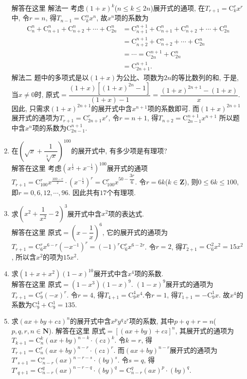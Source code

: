 \documentclass[10pt,a4paper]{article}
\begin{document}
\begin{enumerate}[1.]
解答在这里 解法一  考虑$(1+x)^k$($n\le k\le 2n$)展开式的通项, 在$T_{r+1}=\mathrm{C}_k^rx^r$中, 令$r=n$, 得$T_{n-1}=\mathrm{C}_k^nx^n$, 故$x^n$项的系数为
\begin{align*} \mathrm{C}_n^n+\mathrm{C}_{n+1}^n+\mathrm{C}_{n+2}^n+\cdots +\mathrm{C}_{2n}^n&=\mathrm{C}_{n+1}^{n+1}+\mathrm{C}_{n+1}^n+\mathrm{C}_{n+2}^n+\cdots +\mathrm{C}_{2n}^n\\
&=\mathrm{C}_{n+2}^{n+1}+\mathrm{C}_{n+2}^n+\cdots +\mathrm{C}_{2n}^n \\ &=\cdots =\mathrm{C}_{2n}^{n+1}+\mathrm{C}_{2n}^n \\ &=\mathrm{C}_{2n+1}^{n+1}.
\end{align*}
解法二  题中的多项式是以$(1+x)$为公比、项数为$2n$的等比数列的和, 于是, 当$x\ne 0$时, 原式$=\dfrac{(1+x)[(1+x)^{2n}-1]}{(1+x)-1}=\dfrac{(1+x)^{2n+1}-(1+x)}x$.
因此, 只需求$(1+x)^{2n+1}$的展开式中含$x^{n+1}$项的系数即可.
而$(1+x)^{2n+1}$展开式的通项为$T_{r+1}=\mathrm{C}_{2n+1}^rx^r$, 令$r=n+1$, 得$T_{n+2}=\mathrm{C}_{2n-1}^{n+1}x^{n+1}$
所以题中含$x^n$项的系数为$\mathrm{C}_{2n-1}^{n+1}$.
\item 在$(\sqrt x+\dfrac 1{\sqrt[3]x})^{100}$的展开式中, 有多少项是有理项?\\
解答在这里  考虑$(x^{\frac 12}+x^{-\frac 13})^{100}$展开式的通项$T_{r+1}=\mathrm{C}_{100}^rx^{\frac{100-r}2}\cdot (x^{-\frac 13})^r=\mathrm{C}_{100}^rx^{50-\dfrac{3r}6}$.
令$r=6k$($k\in \mathbf{Z}$), 则$0\le 6k\le 100$, 即$r=0,6,12,\cdots ,96$.
因此共有$17$个有理项.
\item 求$(x^2+\dfrac 1{x^2}-2)^3$展开式中含$x^2$项的表达式.\\
解答在这里  原式$=(x-\dfrac 1x)^6$, 它的展开式的通项为$T_{r+1}=\mathrm{C}_6^rx^{6-r}(-x^{-1})^r=(-1)^r\mathrm{C}_6^rx^{6-2r}$.
令$r=2$, 得$T_{2+1}=\mathrm{C}_6^2x^2=15x^2$, 所以含$x^2$的项为$15x^2$.
\item 求$(1+x+x^2)(1-x)^{10}$展开式中含$x^4$项的系数.\\
解答在这里 原式$=(1-x^3)(1-x)^9$.
$(1-x)^9$展开式的通项为$T_{r+1}=\mathrm{C}_9^r(-x)^r$.
令$r=4$, 得$T_{4+1}=\mathrm{C}_9^4x^4$.令$r=1$, 得$T_{1+1}=-\mathrm{C}_9^1x$.
故$x^4$的系数为$\mathrm{C}_9^4+\mathrm{C}_9^1=135$.
\item 求$(ax+by+cz)^n$的展开式中含$x^py^qz^r$项的系数, 其中$p+q+r=n$($p,q,r,n\in \mathbf{N}$).
解答在这里  原式$=[(ax+by)+cz]^n$, 其展开式的通项为$T_{k+1}=\mathrm{C}_n^k(ax+by)^{n-k}\cdot (cz)^k$.
令$k=r$, 得$T_{r+1}=\mathrm{C}_n^r(ax+by)^{n-r}\cdot (cz)^r$.
而$(ax+by)^{n-r}$展开式的通项为$T'_{s+1}=\mathrm{C}_{n-r}^s(ax)^{n-r-s}\cdot (by)^s$.
令$s=q$, 得$T'_{q+1}=\mathrm{C}_{n-r}^q(ax)^{n-r-q}\cdot (by)^q=\mathrm{C}_{n-r}^q(ax)^p\cdot (by)^q$.

\end{enumerate}
\end{document}
